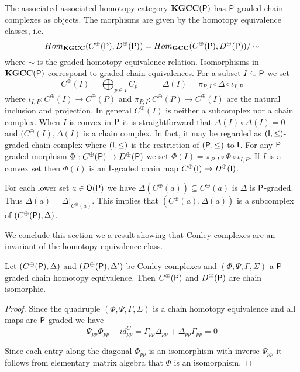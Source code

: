  
 The associated associated homotopy category ${\bf KGCC({\mathsf P})}$ has ${\mathsf P}$-graded chain complexes as objects.  The morphisms are given by the homotopy equivalence classes, i.e. $$Hom_{\bf KGCC}(C^\oplus({\mathsf P}), D^\oplus({\mathsf P})) = Hom_{\bf GCC}(C^\oplus({\mathsf P}),D^\oplus({\mathsf P}))\slash\sim$$ where $\sim$ is the graded homotopy equivalence relation.  Isomorphisms in ${\bf KGCC({\mathsf P})}$ correspond to graded chain equivalences.  For a subset $I\subseteq {\mathsf P}$ we set 
\[
C^\oplus(I) = \bigoplus_{p\in I} C_p\quad\quad \quad \Delta(I) = \pi_{P,I} \circ \Delta \circ \iota_{I,P}
\]
 where $\iota_{I,P}:C^\oplus(I)\to C^\oplus(P)$ and $\pi_{P,I}:C^\oplus(P)\to C^\oplus(I)$ are the natural inclusion and projection.  In general $C^\oplus(I)$ is neither a subcomplex nor a chain complex.  When $I$ is convex in ${\mathsf P}$ it is straightforward that $\Delta(I)\circ\Delta(I) = 0$ and $(C^\oplus(I),\Delta(I)$ is a chain complex.  In fact, it may be regarded as $({\mathsf I},\leq)$-graded chain complex where $({\mathsf I},\leq)$ is the restriction of $({\mathsf P},\leq)$ to ${\mathsf I}$.   For any ${\mathsf P}$-graded morphism $\Phi:C^\oplus({\mathsf P})\to D^\oplus({\mathsf P})$ we set $\Phi(I) = \pi_{P,I} \circ \Phi \circ \iota_{I,P}$.  If $I$ is a convex set then $\Phi(I)$ is an ${\mathsf I}$-graded chain map $C^\oplus({\mathsf I})\to D^\oplus({\mathsf I})$.  
 
 For each lower set $a\in {\mathsf O}({\mathsf P})$ we have $\Delta(C^\oplus(a))\subseteq C^\oplus(a)$ is $\Delta$ is ${\mathsf P}$-graded.  Thus $\Delta(a)=\Delta|_{C^\oplus(a)} $. This implies that $(C^\oplus(a),\Delta(a))$ is a subcomplex of $(C^\oplus({\mathsf P}),\Delta)$.    
 
 We conclude this section we a result showing that Conley complexes are an invariant of the homotopy equivalence class.
 
 \begin{prop}\label{prop:grad:cmiso}
 Let $(C^\oplus({\mathsf P}),\Delta)$ and $(D^\oplus({\mathsf P}),\Delta')$ be Conley complexes and $(\Phi,\Psi,\Gamma,\Sigma)$ a ${\mathsf P}$-graded chain homotopy equivalence.  Then $C^\oplus({\mathsf P})$ and $D^\oplus({\mathsf P})$ are chain isomorphic.
 \end{prop}
  
  
  \begin{proof}
  Since the quadruple $(\Phi,\Psi,\Gamma,\Sigma)$ is a chain homotopy equivalence and all maps are ${\mathsf P}$-graded we have
 \[
 \Psi_{pp}\Phi_{pp} - id^C_{pp} = \Gamma_{pp}\Delta_{pp}+\Delta_{pp}\Gamma_{pp} = 0
 \]
  
Since each entry along the diagonal $\Phi_{pp}$ is an isomorphism with inverse $\Psi_{pp}$ it follows from elementary matrix algebra that $\Phi$ is an isomorphism.  
  \end{proof}
  
%





